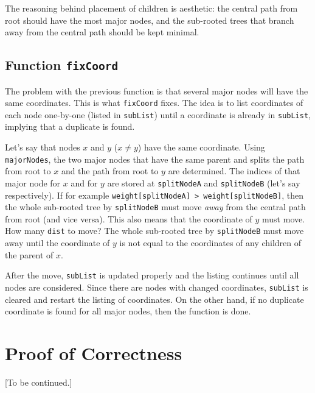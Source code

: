 \documentclass{article}
\theoremstyle{plain}
\theoremstyle{remark}
\begin{document}
The reasoning behind placement of children is aesthetic: the central path from root should have the most major nodes, and the sub-rooted trees that branch away from the central path should be kept minimal.

\subsection{Function \texttt{fixCoord}}
The problem with the previous function is that several major nodes will have the same coordinates. This is what \texttt{fixCoord} fixes. The idea is to list coordinates of each node one-by-one (listed in \texttt{subList}) until a coordinate is already in \texttt{subList}, implying that a duplicate is found.

Let's say that nodes $x$ and $y$ ($x \ne y$) have the same coordinate. Using \texttt{majorNodes}, the two major nodes that have the same parent and splits the path from root to $x$ and the path from root to $y$ are determined. The indices of that major node for $x$ and for $y$ are stored at \texttt{splitNodeA} and \texttt{splitNodeB} (let's say respectively). If for example \texttt{weight[splitNodeA] > weight[splitNodeB]}, then the whole sub-rooted tree by \texttt{splitNodeB} must move \textit{away} from the central path from root (and vice versa). This also means that the coordinate of $y$ must move. How many \texttt{dist} to move? The whole sub-rooted tree by \texttt{splitNodeB} must move away until the coordinate of $y$ is not equal to the coordinates of any children of the parent of $x$.

After the move, \texttt{subList} is updated properly and the listing continues until all nodes are considered. Since there are nodes with changed coordinates, \texttt{subList} is cleared and restart the listing of coordinates. On the other hand, if no duplicate coordinate is found for all major nodes, then the function is done.

\section{Proof of Correctness}
[To be continued.]



\end{document}
